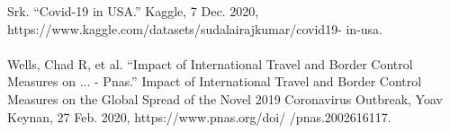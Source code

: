 \documentclass[12pt]{article}
\begin{document}
Srk. “Covid-19 in USA.” Kaggle, 7 Dec. 2020, https://www.kaggle.com/datasets/sudalairajkumar/covid19- \n in-usa. \\\\
Wells, Chad R, et al. “Impact of International Travel and Border Control Measures on ... - \n Pnas.” Impact of International Travel and Border Control Measures on the Global Spread of \n the Novel 2019 Coronavirus Outbreak, Yoav Keynan, 27 Feb. 2020, https://www.pnas.org/doi/ /pnas.2002616117.\\\\
\end{document}
